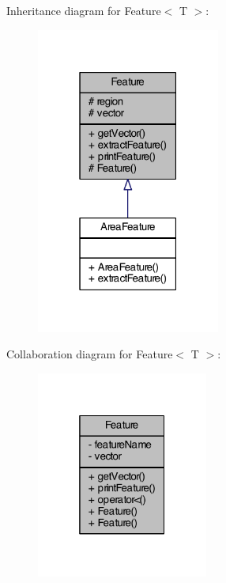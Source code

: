 Inheritance diagram for Feature$<$ T $>$\+:\nopagebreak
\begin{figure}[H]
\begin{center}
\leavevmode
\includegraphics[width=171pt]{class_feature__inherit__graph}
\end{center}
\end{figure}


Collaboration diagram for Feature$<$ T $>$\+:\nopagebreak
\begin{figure}[H]
\begin{center}
\leavevmode
\includegraphics[width=160pt]{class_feature__coll__graph}
\end{center}
\end{figure}


